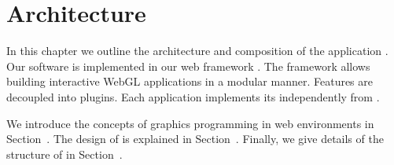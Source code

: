 \documentclass[../ClassicThesis.tex]{subfiles}
\begin{document}
\chapter{Architecture}
\label{ch:architecture}

In this chapter we outline the architecture and composition of the
application {\platener}. Our software is implemented in our web
framework {\convertify}. The framework allows building interactive
WebGL applications in a modular manner. Features are decoupled into
plugins. Each application implements its {\userinterface}
independently from {\convertify}.

We introduce the concepts of graphics programming in web
environments in Section~. The design of {\convertify}
is explained in Section~. Finally, we
give details of the structure of {\platener} in
Section~.








\end{document}

